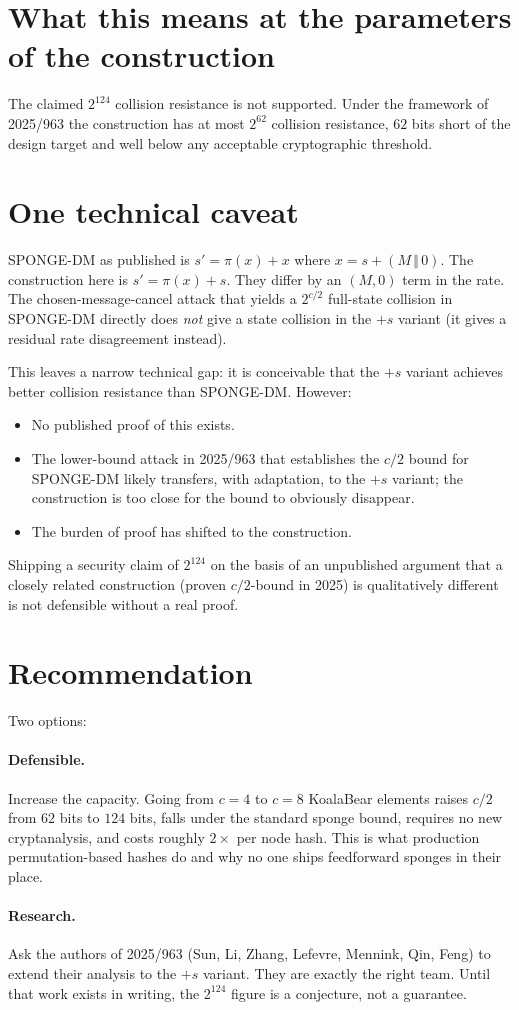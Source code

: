 \documentclass[11pt]{article}
\begin{document}
\section*{What this means at the parameters of the construction}

The claimed $2^{124}$ collision resistance is not supported. Under the framework of 2025/963 the construction has at most $2^{62}$ collision resistance, $62$ bits short of the design target and well below any acceptable cryptographic threshold.

\section*{One technical caveat}

SPONGE-DM as published is $s' = \pi(x) + x$ where $x = s + (M\,\Vert\,0)$. The construction here is $s' = \pi(x) + s$. They differ by an $(M, 0)$ term in the rate. The chosen-message-cancel attack that yields a $2^{c/2}$ full-state collision in SPONGE-DM directly does \emph{not} give a state collision in the $+s$ variant (it gives a residual rate disagreement instead).

This leaves a narrow technical gap: it is conceivable that the $+s$ variant achieves better collision resistance than SPONGE-DM. However:
\begin{itemize}
\item No published proof of this exists.
\item The lower-bound attack in 2025/963 that establishes the $c/2$ bound for SPONGE-DM likely transfers, with adaptation, to the $+s$ variant; the construction is too close for the bound to obviously disappear.
\item The burden of proof has shifted to the construction.
\end{itemize}
Shipping a security claim of $2^{124}$ on the basis of an unpublished argument that a closely related construction (proven $c/2$-bound in 2025) is qualitatively different is not defensible without a real proof.

\section*{Recommendation}

Two options:

\paragraph{Defensible.} Increase the capacity. Going from $c = 4$ to $c = 8$ KoalaBear elements raises $c/2$ from $62$ bits to $124$ bits, falls under the standard sponge bound, requires no new cryptanalysis, and costs roughly $2\times$ per node hash. This is what production permutation-based hashes do and why no one ships feedforward sponges in their place.

\paragraph{Research.} Ask the authors of 2025/963 (Sun, Li, Zhang, Lefevre, Mennink, Qin, Feng) to extend their analysis to the $+s$ variant. They are exactly the right team. Until that work exists in writing, the $2^{124}$ figure is a conjecture, not a guarantee.
\end{document}
